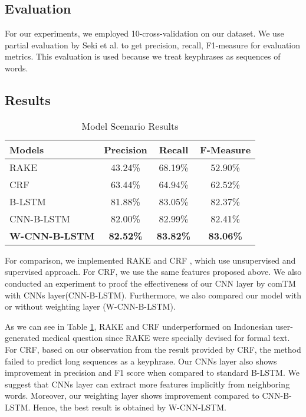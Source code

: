 \documentclass[sigconf]{acmart}
\begin{document}
\subsection{Evaluation}
For our experiments, we employed 10-cross-validation on our dataset. We use partial evaluation by Seki et al. \cite{seki2003probabilistic} to get precision, recall, F1-measure for evaluation metrics. This evaluation is used because we treat keyphrases as sequences of words.  


\subsection{Results}
\begin{table}
	\caption{Model Scenario Results}
	\label{tab:model_scenario}
	\begin{tabular}{lccc}
		\toprule
		Models&Precision&Recall&F-Measure\\
		\midrule
		RAKE & 43.24\% & 68.19\% & 52.90\% \\
		
		CRF & 63.44\% & 64.94\% & 62.52\% \\
		\midrule
		B-LSTM & 81.88\% & 83.05\% & 82.37\% \\
		
		CNN-B-LSTM & 82.00\% & 82.99\% & 82.41\% \\
		
		\textbf{W-CNN-B-LSTM} & \textbf{82.52\%} & \textbf{83.82\%} & \textbf{83.06\%} \\
		\bottomrule
	\end{tabular}
\end{table}


For comparison, we implemented RAKE \cite{rake} and CRF \cite{cao2010automatically}, which use unsupervised and supervised approach. For CRF, we use the same features proposed above. We also conducted an experiment to proof the effectiveness of our CNN layer by comTM with CNNs layer(CNN-B-LSTM). Furthermore, we also compared our model with or without weighting layer (W-CNN-B-LSTM).

As we can see in Table \ref{tab:model_scenario}, RAKE and CRF underperformed on Indonesian user-generated medical question since RAKE were specially devised for formal text. For CRF, based on our observation from the result provided by CRF, the method failed to predict long sequences as a keyphrase. Our CNNs layer also shows improvement in precision and F1 score when compared to standard B-LSTM. We suggest that CNNs layer can extract more features implicitly from neighboring words. Moreover, our weighting layer shows improvement compared to CNN-B-LSTM. Hence, the best result is obtained by W-CNN-LSTM.
\end{document}
